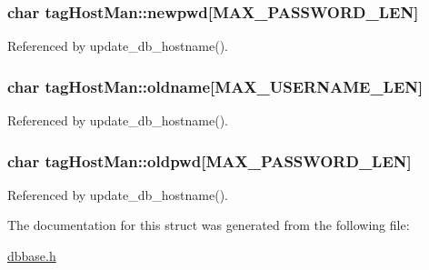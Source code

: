 \hypertarget{structtagHostMan_a9fabe735adf7ccc88052c4b370f45b57}{
\subsubsection[{newpwd}]{\setlength{\rightskip}{0pt plus 5cm}char tag\-Host\-Man\-::newpwd\mbox{[}{\bf M\-A\-X\-\_\-\-P\-A\-S\-S\-W\-O\-R\-D\-\_\-\-L\-E\-N}\mbox{]}}}\label{structtagHostMan_a9fabe735adf7ccc88052c4b370f45b57}


Referenced by update\-\_\-db\-\_\-hostname().

\hypertarget{structtagHostMan_a3413a7557e35439e2db48b7306fef73e}{
\subsubsection[{oldname}]{\setlength{\rightskip}{0pt plus 5cm}char tag\-Host\-Man\-::oldname\mbox{[}{\bf M\-A\-X\-\_\-\-U\-S\-E\-R\-N\-A\-M\-E\-\_\-\-L\-E\-N}\mbox{]}}}\label{structtagHostMan_a3413a7557e35439e2db48b7306fef73e}


Referenced by update\-\_\-db\-\_\-hostname().

\hypertarget{structtagHostMan_accd78689880268e9606e6f74f8edfdfc}{
\subsubsection[{oldpwd}]{\setlength{\rightskip}{0pt plus 5cm}char tag\-Host\-Man\-::oldpwd\mbox{[}{\bf M\-A\-X\-\_\-\-P\-A\-S\-S\-W\-O\-R\-D\-\_\-\-L\-E\-N}\mbox{]}}}\label{structtagHostMan_accd78689880268e9606e6f74f8edfdfc}


Referenced by update\-\_\-db\-\_\-hostname().



The documentation for this struct was generated from the following file\-:\begin{DoxyCompactItemize}
\item 
\hyperlink{dbbase_8h}{dbbase.\-h}\end{DoxyCompactItemize}
